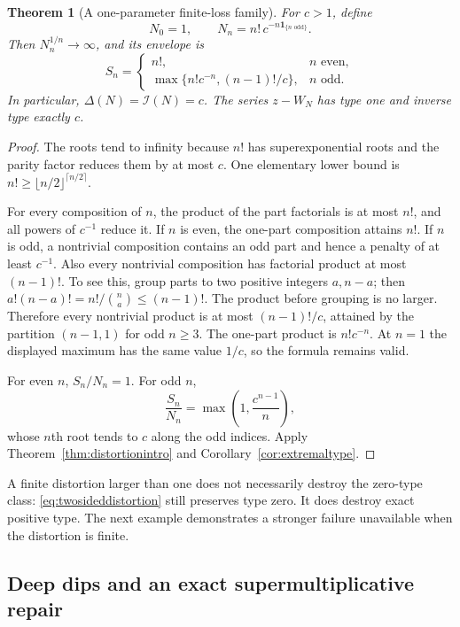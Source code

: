 \documentclass[11pt,a4paper]{article}
\numberwithin{equation}{section}
\newtheorem{theorem}{Theorem}[section]
\theoremstyle{definition}
\theoremstyle{remark}
\begin{document}
\begin{theorem}[A one-parameter finite-loss family]
\label{thm:finiteloss}
For $c>1$, define
\begin{equation}
 N_0=1,\qquad N_n=n!\,c^{-n\boldsymbol1_{\{n\text{ odd}\}}}.
 \label{eq:finiteloss}
\end{equation}
Then $N_n^{1/n}\to\infty$, and its envelope is
\begin{equation}
 S_n=
 \begin{cases}
 n!,&n\text{ even},\\
 \max\{n!c^{-n},(n-1)!/c\},&n\text{ odd}.
 \end{cases}
 \label{eq:finitelossenvelope}
\end{equation}
In particular, $\Delta(N)=\mathcal I(N)=c$. The series $z-W_N$
has type one and inverse type exactly $c$.
\end{theorem}
\begin{proof}
The roots tend to infinity because $n!$ has superexponential roots and
the parity factor reduces them by at most $c$. One elementary lower
bound is $n!\ge\lfloor n/2\rfloor^{\lceil n/2\rceil}$.

For every composition of $n$, the product of the part factorials is at
most $n!$, and all powers of $c^{-1}$ reduce it. If $n$ is even, the
one-part composition attains $n!$. If $n$ is odd, a nontrivial
composition contains an odd part and hence a penalty of at least $c^{-1}$.
Also every nontrivial composition has factorial product at most
$(n-1)!$. To see this, group parts to two positive integers $a,n-a$;
then $a!(n-a)!=n!/\binom na\le(n-1)!$. The product before grouping is
no larger. Therefore every nontrivial product is at most $(n-1)!/c$,
attained by the partition $(n-1,1)$ for odd $n\ge3$. The one-part
product is $n!c^{-n}$. At $n=1$ the displayed maximum has the same
value $1/c$, so the formula remains valid.

For even $n$, $S_n/N_n=1$. For odd $n$,
\[
 \frac{S_n}{N_n}=\max\left(1,\frac{c^{n-1}}{n}\right),
\]
whose $n$th root tends to $c$ along the odd indices. Apply
Theorem~\ref{thm:distortionintro} and
Corollary~\ref{cor:extremaltype}.
\end{proof}

A finite distortion larger than one does not necessarily destroy the
zero-type class: \eqref{eq:twosideddistortion} still preserves type zero.
It does destroy exact positive type. The next example demonstrates a
stronger failure unavailable when the distortion is finite.

\subsection{Deep dips and an exact supermultiplicative repair}
\end{document}
